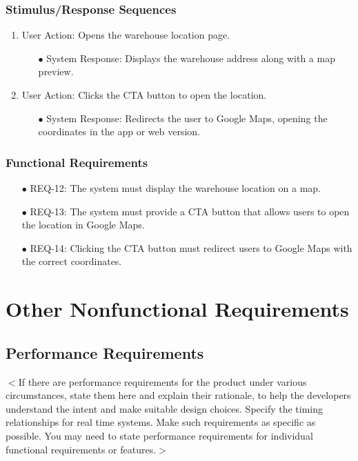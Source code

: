 \documentclass[oneside,a4paper,12pt,explicit]{book}
\begin{document}
\subsection{Stimulus/Response Sequences}
\begin{enumerate}
    \item User Action: Opens the warehouse location page.
    \begin{enumerate}
        \item[$\bullet$] System Response: Displays the warehouse address along with a map preview.
    \end{enumerate}
    \item User Action: Clicks the CTA button to open the location.
    \begin{enumerate}
        \item[$\bullet$] System Response: Redirects the user to Google Maps, opening the coordinates in the app or web version.
    \end{enumerate}
\end{enumerate}

\subsection{Functional Requirements}
\begin{enumerate}
    \item[$\bullet$] REQ-12: The system must display the warehouse location on a map.
    \item[$\bullet$] REQ-13: The system must provide a CTA button that allows users to open the location in Google Maps.
    \item[$\bullet$] REQ-14: Clicking the CTA button must redirect users to Google Maps with the correct coordinates.
\end{enumerate}



\chapter{Other Nonfunctional Requirements}

\section{Performance Requirements}
$<$If there are performance requirements for the product under various 
circumstances, state them here and explain their rationale, to help the 
developers understand the intent and make suitable design choices. Specify the 
timing relationships for real time systems. Make such requirements as specific 
as possible. You may need to state performance requirements for individual 
functional requirements or features.$>$
\end{document}
